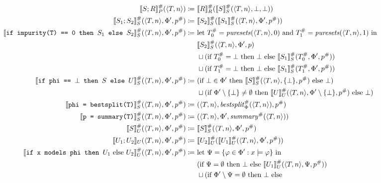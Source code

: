 \begin{figure}
\centering
\newcommand{\argtuple}{\langle T, n \rangle, \Phi', p^\#}
\begin{align*}
\den[P]{S ; R}^\#(\langle T, n \rangle) \coloneqq&~
\den[R]{R}^\#(\den[S]{S}^\#(\langle T, n \rangle, \bot, \bot)) \\
%
\den[S]{S_1 ; S_2}^\#(\argtuple) \coloneqq&~
\den[S]{S_2}^\#(\den[S]{S_1}^\#(\argtuple)) \\
%
\den[S]{\iteimpuritynode{S_1}{S_2}}^\#(\argtuple) \coloneqq&~
\text{let } T_0^\# = \mathit{puresets}(\langle T, n \rangle, 0) \text{ and }
T_1^\# = \mathit{puresets}(\langle T, n \rangle, 1) \text{ in } \\
&~\den[S]{S_2}^\#(\langle T, n \rangle, \Phi', p) \\
&~\sqcup
(\text{if } T_0^\# = \bot \text{ then } \bot \text{ else } \den[S]{S_1}^\#(T_0^\#, \Phi', p^\#)) \\
&~\sqcup
(\text{if } T_1^\# = \bot \text{ then } \bot \text{ else } \den[S]{S_1}^\#(T_1^\#, \Phi', p^\#)) \\
%
\den[S]{\itetrivialnode{S}{U}}^\#(\argtuple) \coloneqq&~
(\text{if } \bot \in \Phi' \text{ then } \den[S]{S}^\#(\langle T, n \rangle, \{\bot\}, p^\#) \text{ else } \bot) \\
&~\sqcup
(\text{if } \Phi' \setminus \{\bot\} \neq \emptyset \text{ then }
\den[U]{U}^\#(\langle T, n \rangle, \Phi' \setminus \{\bot\}, p^\#) \text{ else } \bot)\\
%
\den[S]{\bestsplitnode}^\#(\argtuple)
\coloneqq&~ (\langle T, n \rangle, \mathit{bestsplit}_\Phi^\#(\langle T, n \rangle), p^\#) \\
%
\den[S]{\summarynode}^\#(\argtuple) \coloneqq&~
(\langle T, n \rangle, \Phi', \mathit{summary}^\#(\langle T, n \rangle)) \\
%
\den[U]{S}^\#(\argtuple) \coloneqq&~
\den[S]{S}^\#(\argtuple) \\
%
\den[U]{U_1 ; U_2}(\argtuple) \coloneqq&~
\den[U]{U_2}^\#(\den[U]{U_1}^\#(\argtuple)) \\
%
\den[U]{\itemodelsnode{U_1}{U_2}}^\#(\argtuple) \coloneqq&~
\text{let } \Psi = \{\varphi \in \Phi' : x \models \varphi\} \text{ in } \\
&~(\text{if } \Psi = \emptyset \text{ then } \bot \text{ else }
\den[U]{U_1}^\#(\langle T, n \rangle, \Psi, p^\#)) \\
&~\sqcup
(\text{if } \Phi' \setminus \Psi = \emptyset \text{ then } \bot \text{ else }

\end{align*}
\end{figure}
